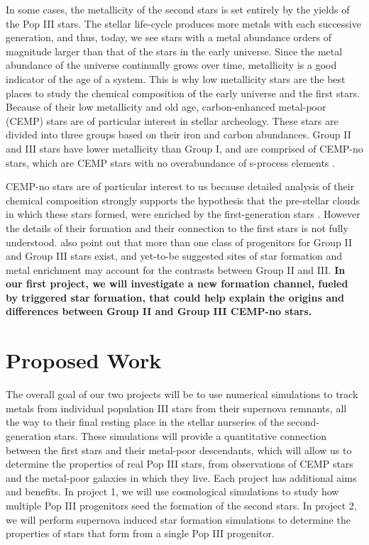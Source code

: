 \documentclass[letterpaper, 12pt]{article}
\begin{document}
In some cases, the metallicity of the second stars is set entirely by the yields of the Pop III stars. The stellar life-cycle produces more metals with each successive generation, and thus, today, we see stars with a metal abundance orders of magnitude larger than that of the stars in the early universe. Since the metal abundance of the universe continually grows over time, metallicity is a good indicator of the age of a system. This is why low metallicity stars are the best places to study the chemical composition of the early universe and the first stars. Because of their low metallicity and old age, carbon-enhanced metal-poor (CEMP) stars are of particular interest in stellar archeology. These stars are divided into three groups based on their iron and carbon abundances. Group II and III stars have lower metallicity than Group I, and are comprised of CEMP-no stars, which are CEMP stars with no overabundance of s-process elements \citep{Maeder2015}. 

CEMP-no stars are of particular interest to us because detailed analysis of their chemical composition strongly supports the hypothesis that the pre-stellar clouds in which these stars formed, were enriched by the first-generation stars \citep{Yoon2016}. However the details of their formation and their connection to the first stars is not fully understood. \cite{Yoon2016} also point out that more than one class of progenitors for Group II and Group III stars exist, and yet-to-be suggested sites of star formation and metal enrichment may account for the contrasts between Group II and III. \textbf{In our first project, we will investigate a new formation channel, fueled by triggered star formation, that could help explain the origins and differences between Group II and Group III CEMP-no stars.}


\section{Proposed Work}
The overall goal of our two projects will be to use numerical simulations to track metals from individual population III stars from their supernova remnants, all the way to their final resting place in the stellar nurseries of the second-generation stars. These simulations will provide a quantitative connection between the first stars and their metal-poor descendants, which will allow us to determine the properties of real Pop III stars, from observations of CEMP stars and the metal-poor galaxies in which they live. Each project has additional aims and benefits. In project 1, we will use cosmological simulations to study how multiple Pop III progenitors seed the formation of the second stars. In project 2, we will perform supernova induced star formation simulations to determine the properties of stars that form from a single Pop III progenitor.
\end{document}
